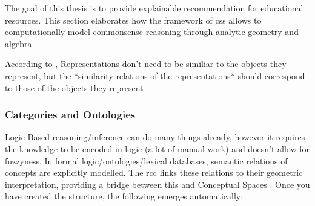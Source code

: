 The goal of this thesis is to provide explainable recommendation for educational resources. This section elaborates how the framework of \glspl{cs} allows to computationally model commonsense reasoning through analytic geometry and algebra.


According to \cite{Gardenfors2000a}, Representations don't need to be similiar to the objects they represent, but the *similarity relations of the representations* should correspond to those of the objects they represent

\subsubsection*{Categories and Ontologies}



Logic-Based reasoning/inference can do many things already, however it requires the knowledge to be encoded in logic (a lot of manual work) and doesn't allow for fuzzyness.
In formal logic/ontologies/lexical databases, semantic relations of concepts are explicitly modelled. The \gls{rcc} \cite{Cohn1997a} links these relations to their geometric interpretation, providing a bridge between this and Conceptual Spaces \cite{Gardenfors2001}. Once you have created the structure, the following emerges automatically:

\vspace{2ex}

